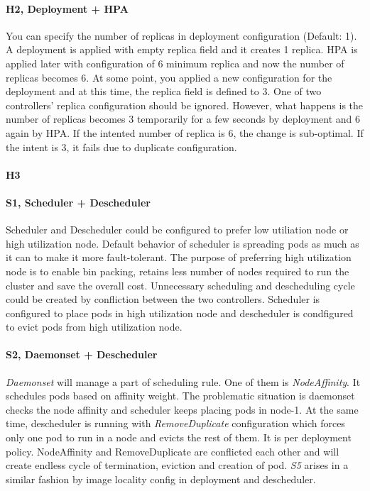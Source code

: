 \paragraph*{H2, Deployment + HPA}
You can specify the number of replicas in deployment configuration (Default: 1). A deployment is applied with empty replica field and it creates 1 replica. HPA is applied later with configuration of 6 minimum replica and now the number of replicas becomes 6. At some point, you applied a new configuration for the deployment and at this time, the replica field is defined to 3. One of two controllers' replica configuration should be ignored. However, what happens is the number of replicas becomes 3 temporarily for a few seconds by deployment and 6 again by HPA. If the intented number of replica is 6, the change is sub-optimal. If the intent is 3, it fails due to duplicate configuration.

\paragraph*{H3}

\paragraph*{S1, Scheduler + Descheduler}
Scheduler and Descheduler could be configured to prefer low utiliation node or high utilization node. Default behavior of scheduler is spreading pods as much as it can to make it more fault-tolerant. The purpose of preferring high utilization node is to enable bin packing, retains less number of nodes required to run the cluster and save the overall cost. Unnecessary scheduling and descheduling cycle could be created by confliction between the two controllers. Scheduler is configured to place pods in high utilization node and descheduler is condfigured to evict pods from high utilization node. 

\paragraph*{S2, Daemonset + Descheduler}
\textit{Daemonset} will manage a part of scheduling rule. One of them is \textit{NodeAffinity}. It schedules pods based on affinity weight. The problematic situation is daemonset checks the node affinity and scheduler keeps placing pods in node-1. At the same time, descheduler is running with \textit{RemoveDuplicate} configuration which forces only one pod to run in a node and evicts the rest of them. It is per deployment policy. NodeAffinity and RemoveDuplicate are conflicted each other and will create endless cycle of termination, eviction and creation of pod. 
\textit{S5} arises in a similar fashion by image locality config in deployment and descheduler.

